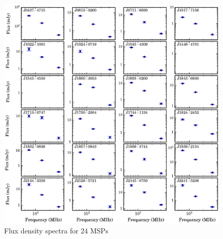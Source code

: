 \documentclass[useAMS,usenatbib]{mn2e}
\begin{document}
\begin{table}
\begin{tabular}{lccccccc}
\hline
\end{tabular}
\end{table}

\begin{figure}
\begin{center}
\includegraphics[width=6 in]{specIndex.ps}
\caption{Flux density spectra for $24$ MSPs} 
\label{index}
\end{center}
\end{figure}
\end{document}
